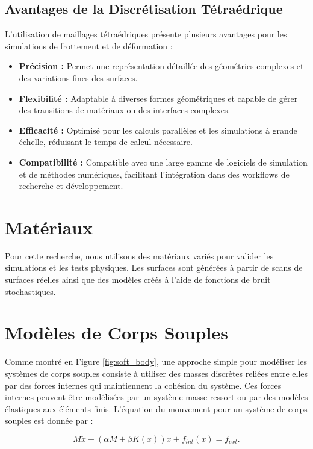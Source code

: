\subsection{Avantages de la Discrétisation Tétraédrique}

L'utilisation de maillages tétraédriques présente plusieurs avantages pour les simulations de frottement et de déformation :
\begin{itemize}
    \item \textbf{Précision :} Permet une représentation détaillée des géométries complexes et des variations fines des surfaces.
    \item \textbf{Flexibilité :} Adaptable à diverses formes géométriques et capable de gérer des transitions de matériaux ou des interfaces complexes.
    \item \textbf{Efficacité :} Optimisé pour les calculs parallèles et les simulations à grande échelle, réduisant le temps de calcul nécessaire.
    \item \textbf{Compatibilité :} Compatible avec une large gamme de logiciels de simulation et de méthodes numériques, facilitant l'intégration dans des workflows de recherche et développement.
\end{itemize}


\section{Mat\'eriaux}
Pour cette recherche, nous utilisons des mat\'eriaux vari\'es pour valider les simulations et les tests physiques. Les surfaces sont g\'en\'er\'ees \`a partir de scans de surfaces r\'eelles ainsi que des mod\`eles cr\'e\'es \`a l'aide de fonctions de bruit stochastiques.

\section{Modèles de Corps Souples}
Comme montré en Figure \ref{fig:soft_body}, une approche simple pour modéliser les systèmes de corps souples consiste à utiliser des masses discrètes reliées entre elles par des forces internes qui maintiennent la cohésion du système. Ces forces internes peuvent être modélisées par un système masse-ressort ou par des modèles élastiques aux éléments finis. L’équation du mouvement pour un système de corps souples est donnée par :

\begin{equation}
M \ddot{x} + (\alpha M + \beta K(x)) \dot{x} + f_{int}(x) = f_{ext}. \label{eq:soft_body}
\end{equation}

